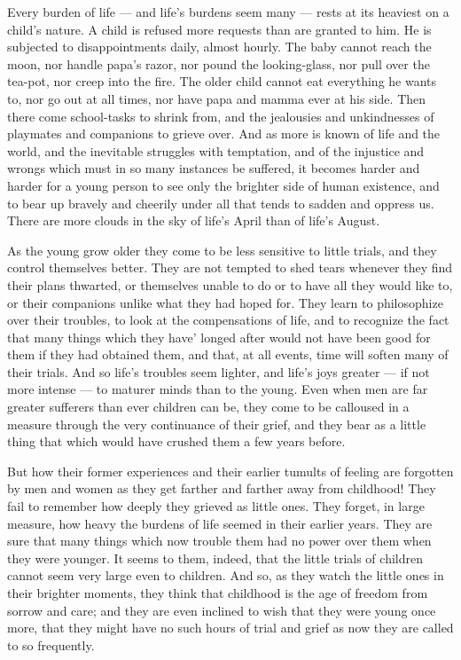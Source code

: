 \documentclass[
]{book}
\begin{document}
Every burden of life --- and life's burdens seem many --- rests at its heaviest on a child's nature. A child is refused more requests than are granted to him. He is subjected to disappointments daily, almost hourly. The baby cannot reach the moon, nor handle papa's razor, nor pound the looking-glass, nor pull over the tea-pot, nor creep into the fire. The older child cannot eat everything he wants to, nor go out at all times, nor have papa and mamma ever at his side. Then there come school-tasks to shrink from, and the jealousies and unkindnesses of playmates and companions to grieve over. And as more is known of life and the world, and the inevitable struggles with temptation, and of the injustice and wrongs which must in so many instances be suffered, it becomes harder and harder for a young person to see only the brighter side of human existence, and to bear up bravely and cheerily under all that tends to sadden and oppress us. There are more clouds in the sky of life's April than of life's August.

As the young grow older they come to be less sensitive to little trials, and they control themselves better. They are not tempted to shed tears whenever they find their plans thwarted, or themselves unable to do or to have all they would like to, or their companions unlike what they had hoped for. They learn to philosophize over their troubles, to look at the compensations of life, and to recognize the fact that many things which they have' longed after would not have been good for them if they had obtained them, and that, at all events, time will soften many of their trials. And so life's troubles seem lighter, and life's joys greater --- if not more intense --- to maturer minds than to the young. Even when men are far greater sufferers than ever children can be, they come to be calloused in a measure through the very continuance of their grief, and they bear as a little thing that which would have crushed them a few years before.

But how their former experiences and their earlier tumults of feeling are forgotten by men and women as they get farther and farther away from childhood! They fail to remember how deeply they grieved as little ones. They forget, in large measure, how heavy the burdens of life seemed in their earlier years. They are sure that many things which now trouble them had no power over them when they were younger. It seems to them, indeed, that the little trials of children cannot seem very large even to children. And so, as they watch the little ones in their brighter moments, they think that childhood is the age of freedom from sorrow and care; and they are even inclined to wish that they were young once more, that they might have no such hours of trial and grief as now they are called to so frequently.
\end{document}
